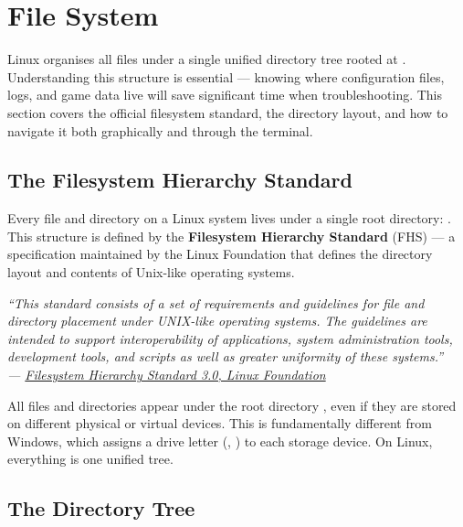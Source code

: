 \documentclass{article}
\begin{document}
\section{File System}

Linux organises all files under a single unified directory tree rooted at \directory{/}.
Understanding this structure is essential --- knowing where configuration files, logs,
and game data live will save significant time when troubleshooting. This section covers
the official filesystem standard, the directory layout, and how to navigate it both
graphically and through the terminal.

\subsection{The Filesystem Hierarchy Standard}

Every file and directory on a Linux system lives under a single root directory:
\directory{/}. This structure is defined by the \textbf{Filesystem Hierarchy
	Standard} (FHS) --- a specification maintained by the Linux Foundation that defines
the directory layout and contents of Unix-like operating systems.

\begin{mdframed}[linewidth=1.5pt, linecolor=black!50, topline=true, bottomline=true,
	leftline=false, rightline=false, backgroundcolor=black!3]
	\small\itshape
	``This standard consists of a set of requirements and guidelines for file and
	directory placement under UNIX-like operating systems. The guidelines are intended
	to support interoperability of applications, system administration tools,
	development tools, and scripts as well as greater uniformity of these systems.''\\[4pt]
	\normalfont\small ---
	\href{https://refspecs.linuxfoundation.org/FHS_3.0/fhs/index.html}{Filesystem
		Hierarchy Standard 3.0, Linux Foundation}
\end{mdframed}

\noindent All files and directories appear under the root directory \directory{/}, even
if they are stored on different physical or virtual devices.  This is
fundamentally different from Windows, which assigns a drive letter (,
) to each storage device. On Linux, everything is one unified tree.

\subsection{The Directory Tree}
\end{document}
